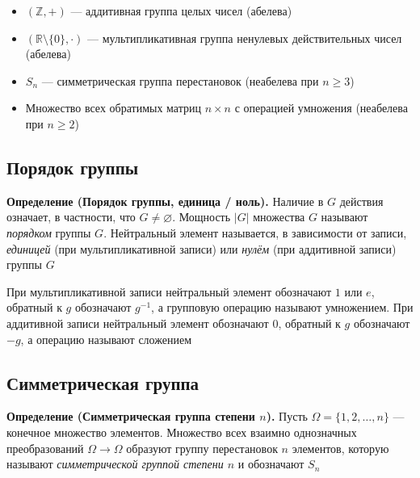 \documentclass[a4paper,12pt]{article}
\theoremstyle{definition}
\theoremstyle{plain}
\theoremstyle{remark}
\begin{document}
	\begin{tcolorbox}[colback=blue!5, colframe=blue!40!black, title=Примеры групп]
		\begin{itemize}
			\item $(\mathbb{Z}, +)$ — аддитивная группа целых чисел (абелева)
			\item $(\mathbb{R}\setminus\{0\}, \cdot)$ — мультипликативная группа ненулевых действительных чисел (абелева)
			\item $S_n$ — симметрическая группа перестановок (неабелева при $n \geq 3$)
			\item Множество всех обратимых матриц $n \times n$ с операцией умножения (неабелева при $n \geq 2$)
		\end{itemize}
	\end{tcolorbox}
	
	\subsection{Порядок группы}
	
	\noindent \textbf{Определение (Порядок группы, единица / ноль).}
	Наличие в $G$ действия означает, в частности, что $G \neq \varnothing$. Мощность $|G|$ множества $G$ называют \textit{порядком} группы $G$. Нейтральный элемент называется, в зависимости от записи, \textit{единицей} (при мультипликативной записи) или \textit{нулём} (при аддитивной записи) группы $G$
	
	\begin{tcolorbox}[colback=yellow!5, colframe=orange!60!black, title=Замечание о записи]
		При мультипликативной записи нейтральный элемент обозначают $1$ или $e$, обратный к $g$ обозначают $g^{-1}$, а групповую операцию называют умножением.
		При аддитивной записи нейтральный элемент обозначают $0$, обратный к $g$ обозначают $-g$, а операцию называют сложением
	\end{tcolorbox}
	
	\subsection{Симметрическая группа}
	
	\noindent \textbf{Определение (Симметрическая группа степени $n$).}
	Пусть $\Omega = \{1, 2, \dots, n\}$ — конечное множество элементов. Множество всех взаимно однозначных преобразований $\Omega \to \Omega$ образуют группу перестановок $n$ элементов, которую называют \textit{симметрической группой степени $n$} и обозначают $S_n$
	
\end{document}
